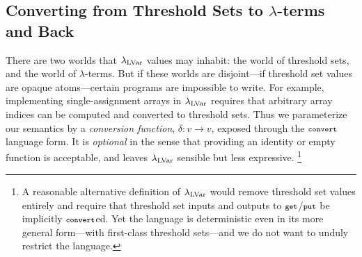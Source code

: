 \subsection{Converting from Threshold Sets to $\lambda$-terms and Back}

{There are two worlds that $\textup{\ensuremath{\lambda_{\textrm{LVar}}}}$ values
may inhabit: the world of threshold sets, and the world of
$\lambda$-terms.  
%
But if these worlds are disjoint---if threshold set values are opaque
atoms---certain programs are impossible to write.  For example,
implementing single-assignment arrays in $\textup{\ensuremath{\lambda_{\textrm{LVar}}}}$ requires
that arbitrary array indices can be computed  and converted to threshold sets.
}
{Thus we parameterize our semantics by a {\em conversion
    function}, $\delta : v \rightarrow v$, 
   exposed through the $\mbox{\footnotesize \texttt{convert}}$ language form.
  It is {\em optional} in the sense that providing
  an identity or empty function is acceptable, and leaves $\textup{\ensuremath{\lambda_{\textrm{LVar}}}}$
  sensible but less expressive.
\footnote{A
    reasonable alternative definition of $\textup{\ensuremath{\lambda_{\textrm{LVar}}}}$ would 
    remove threshold set values entirely and require that threshold
    set inputs and outputs to $\mbox{\footnotesize \texttt{get}}$/$\mbox{\footnotesize \texttt{put}}$ be implicitly
    $\mbox{\footnotesize \texttt{convert}}$ed.  Yet the language is deterministic even in its more
    general form---with first-class threshold sets---and we do not want 
    to unduly restrict the language.}
\fi{}
}

